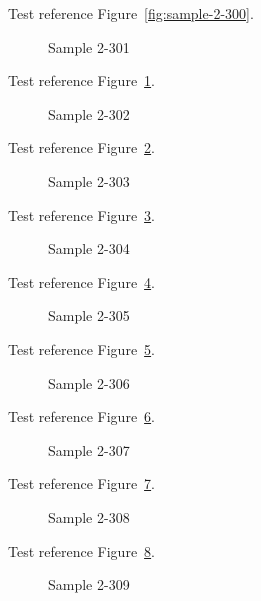 Test reference Figure~\ref{fig:sample-2-300}.

\begin{figure}[tbhp]
\caption{Sample 2-301}
\label{fig:sample-2-301}
\end{figure}

Test reference Figure~\ref{fig:sample-2-301}.

\begin{figure}[tbhp]
\caption{Sample 2-302}
\label{fig:sample-2-302}
\end{figure}

Test reference Figure~\ref{fig:sample-2-302}.

\begin{figure}[tbhp]
\caption{Sample 2-303}
\label{fig:sample-2-303}
\end{figure}

Test reference Figure~\ref{fig:sample-2-303}.

\begin{figure}[tbhp]
\caption{Sample 2-304}
\label{fig:sample-2-304}
\end{figure}

Test reference Figure~\ref{fig:sample-2-304}.

\begin{figure}[tbhp]
\caption{Sample 2-305}
\label{fig:sample-2-305}
\end{figure}

Test reference Figure~\ref{fig:sample-2-305}.

\begin{figure}[tbhp]
\caption{Sample 2-306}
\label{fig:sample-2-306}
\end{figure}

Test reference Figure~\ref{fig:sample-2-306}.

\begin{figure}[tbhp]
\caption{Sample 2-307}
\label{fig:sample-2-307}
\end{figure}

Test reference Figure~\ref{fig:sample-2-307}.

\begin{figure}[tbhp]
\caption{Sample 2-308}
\label{fig:sample-2-308}
\end{figure}

Test reference Figure~\ref{fig:sample-2-308}.

\begin{figure}[tbhp]
\caption{Sample 2-309}
\label{fig:sample-2-309}
\end{figure}

